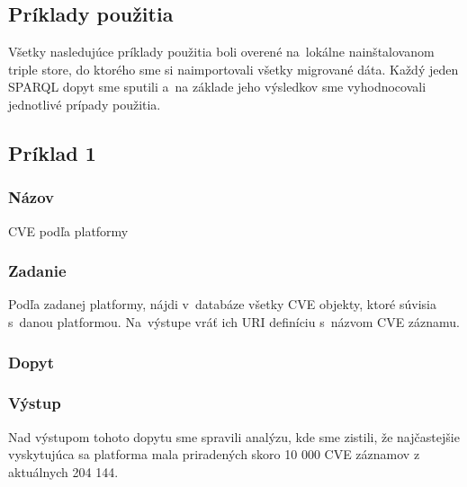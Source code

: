 \documentclass[12pt, a4paper, oneside]{book}
\begin{document}
\subsection{Príklady použitia}
Všetky nasledujúce príklady použitia boli overené na~lokálne nainštalovanom triple store, do ktorého sme si naimportovali všetky migrované dáta. Každý jeden SPARQL dopyt sme sputili a~na základe jeho výsledkov sme vyhodnocovali jednotlivé prípady použitia.
\subsection*{Príklad 1}
\label{sec:priklad1}
\subsubsection*{Názov}
CVE podľa platformy

\subsubsection*{Zadanie}
Podľa zadanej platformy, nájdi v~databáze všetky CVE objekty, ktoré súvisia s~danou platformou. Na~výstupe vráť ich URI definíciu s~názvom CVE záznamu.

\subsubsection*{Dopyt}


\subsubsection*{Výstup}
Nad výstupom tohoto dopytu sme spravili analýzu, kde sme zistili, že najčastejšie vyskytujúca sa platforma mala priradených skoro 10 000 CVE záznamov z aktuálnych 204 144.
\end{document}
